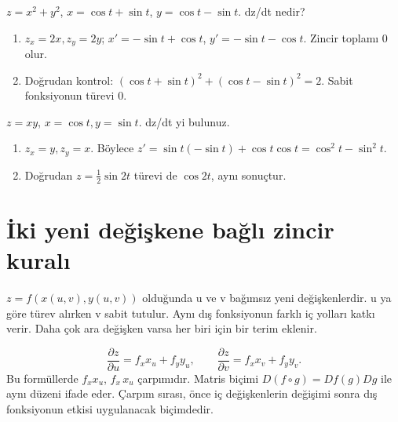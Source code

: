 \begin{tcolorbox}[title={Örnek 6.1 | Tahtadaki trigonometrik zincir örneği},colframe=accent]\(z=x^2+y^2\), \(x=\cos t+\sin t\), \(y=\cos t-\sin t\). dz/dt nedir?
\par{}\end{tcolorbox}
\begin{tcolorbox}[title={Adım adım çözüm},colback=green!3!white,colframe=green]\begin{enumerate}
\item \(z_x=2x,z_y=2y\); \(x\prime=-\sin t+\cos t\), \(y\prime=-\sin t-\cos t\). Zincir toplamı 0 olur.
\item Doğrudan kontrol: \((\cos t+\sin t)^2+(\cos t-\sin t)^2=2\). Sabit fonksiyonun türevi 0.
\end{enumerate}\end{tcolorbox}
\begin{tcolorbox}[title={Örnek 6.2 | Çarpanlı fonksiyonda zincir kuralı},colframe=accent]\(z=xy\), \(x=\cos t,y=\sin t\). dz/dt yi bulunuz.
\par{}\end{tcolorbox}
\begin{tcolorbox}[title={Adım adım çözüm},colback=green!3!white,colframe=green]\begin{enumerate}
\item \(z_x=y,z_y=x\). Böylece \(z\prime=\sin t(-\sin t)+\cos t\cos t=\cos^2t-\sin^2t\).
\item Doğrudan \(z=\tfrac12\sin2t\) türevi de \(\cos2t\), aynı sonuçtur.
\end{enumerate}\end{tcolorbox}
\section{İki yeni değişkene bağlı zincir kuralı}
\(z=f(x(u,v),y(u,v))\) olduğunda u ve v bağımsız yeni değişkenlerdir. u ya göre türev alırken v sabit tutulur. Aynı dış fonksiyonun farklı iç yolları katkı verir. Daha çok ara değişken varsa her biri için bir terim eklenir.


{\small\[
\frac{\partial z}{\partial u}=f_xx_u+f_yy_u,\qquad\frac{\partial z}{\partial v}=f_xx_v+f_yy_v.
\]}
Bu formüllerde \(f_xx_u\), \(f_x\,x_u\) çarpımıdır. Matris biçimi \(D(f\circ g)=Df(g)Dg\) ile aynı düzeni ifade eder. Çarpım sırası, önce iç değişkenlerin değişimi sonra dış fonksiyonun etkisi uygulanacak biçimdedir.

